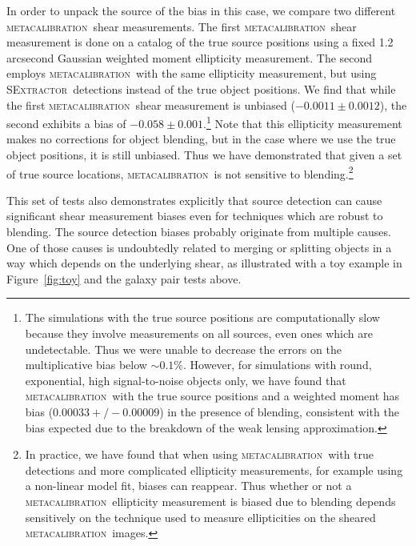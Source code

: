 \documentclass[fleqn,useAMS,usenatbib]{mnras}
\newcommand{\mcal}{\textsc{metacalibration}}
\newcommand{\sx}{\textsc{SExtractor}}
\begin{document}
In order to unpack the source of the bias in this case, we compare two
different \mcal\ shear measurements. The first \mcal\ shear measurement is done
on a catalog of the true source positions using a fixed 1.2 arcsecond Gaussian
weighted moment ellipticity measurement. The second employs \mcal\ with the
same ellipticity measurement, but using \sx\ detections instead of the true
object positions. We find that while the first \mcal\ shear measurement is
unbiased ($-0.0011\pm0.0012$), the second exhibits a bias of
$-0.058\pm0.001$.\footnote{The simulations with the true source positions are
computationally slow because they involve measurements on all sources, even
ones which are undetectable. Thus we were unable to decrease the errors on the
multiplicative bias below $\sim0.1\%$. However, for simulations with round,
exponential, high signal-to-noise objects only, we have found that \mcal\ with
the true source positions and a weighted moment has bias ($0.00033 +/-
0.00009$) in the presence of blending, consistent with the bias expected due to
the breakdown of the weak lensing approximation.} Note that this ellipticity
measurement makes no corrections for object blending, but in the case where we
use the true object positions, it is still unbiased. Thus we have demonstrated
that given a set of true source locations, \mcal\ is not sensitive to
blending.\footnote{In practice, we have found that when using \mcal\ with true
detections and more complicated ellipticity measurements, for example using a
non-linear model fit, biases can reappear. Thus whether or not a \mcal\
ellipticity measurement is biased due to blending depends sensitively on the
technique used to measure ellipticities on the sheared \mcal\ images.}

This set of tests also demonstrates explicitly that source detection can cause
significant shear measurement biases even for techniques which are robust to
blending. The source detection biases probably originate from multiple causes.
One of those causes is undoubtedly related to merging or splitting objects in a
way which depends on the underlying shear, as illustrated with a toy example in
Figure~\ref{fig:toy} and the galaxy pair tests above.

\end{document}
